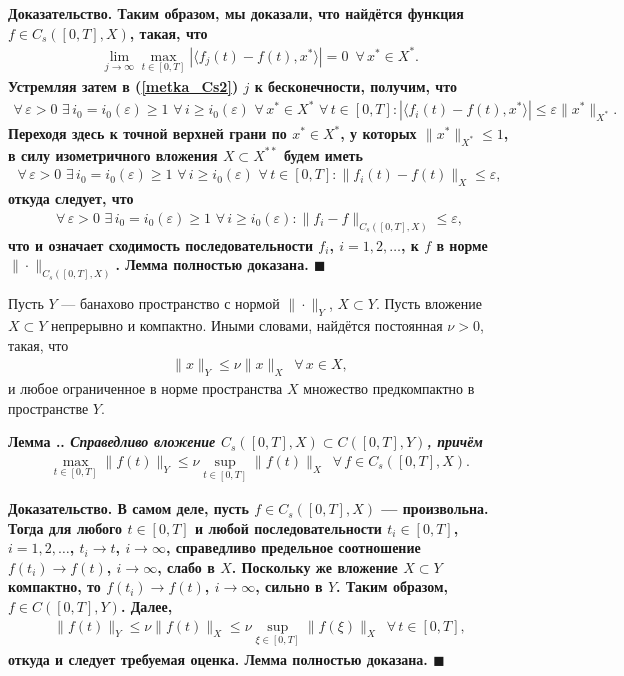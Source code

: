 \documentclass{report}
\newcounter{lem}[section]
\renewcommand{\thelem}{\thesection.\arabic{lem}}
\newenvironment{Lemma}{\par\refstepcounter{lem}\bf Лемма \thelem. \it}{\rm\par}
\newenvironment{Proof}{\par\noindent\bf Доказательство.\rm}{ $\blacksquare$\par}
\begin{document}
\begin{Proof}
Таким образом, мы доказали, что найдётся функция $f\in C_s([0,T],X)$, такая, что
\begin{gather*}
\lim\limits_{j\to\infty}\max\limits_{t\in[0,T]}|\langle f_j(t)-f(t),x^*\rangle|=0\,\,\,\forall\,x^*\in X^*.
\end{gather*}
Устремляя затем в (\ref{metka_Cs2}) $j$ к бесконечности, получим, что
\begin{gather*}
\forall\,\varepsilon>0\,\,\exists\,i_0=i_0(\varepsilon)\geqslant1\,\,\forall\,i\geqslant i_0(\varepsilon)\,\,
\forall\,x^*\in X^*\,\,\forall\,t\in[0,T]:|\langle f_i(t)-f(t),x^*\rangle|\leqslant\varepsilon\|x^*\|_{X^*}.
\end{gather*}
Переходя здесь к точной верхней грани по $x^*\in X^*$, у которых $\|x^*\|_{X^*}\leqslant1$, в силу изометричного вложения
$X\subset X^{**}$ будем иметь
\begin{gather*}
\forall\,\varepsilon>0\,\,\exists\,i_0=i_0(\varepsilon)\geqslant1\,\,\forall\,i\geqslant i_0(\varepsilon) \,\,\forall\,t\in[0,T]:\|f_i(t)-f(t)\|_X\leqslant\varepsilon,
\end{gather*}
откуда следует, что
\begin{gather*}
\forall\,\varepsilon>0\,\,\exists\,i_0=i_0(\varepsilon)\geqslant1\,\,\forall\,i\geqslant i_0(\varepsilon):\|f_i-f\|_{C_s([0,T],X)}\leqslant\varepsilon,
\end{gather*}
что и означает сходимость последовательности $f_i$, $i=1,2,\dots$, к $f$ в норме $\|\cdot\|_{C_s([0,T],X)}$. Лемма полностью доказана.
\end{Proof}

Пусть $Y$ --- банахово пространство с нормой $\|\cdot\|_Y$, $X\subset Y$. Пусть вложение $X\subset Y$ непрерывно и компактно. Иными словами, найдётся постоянная $\nu>0$, такая, что
\begin{gather*}
\|x\|_Y\leqslant\nu\|x\|_X\,\,\,\forall\,x\in X,
\end{gather*}
и любое ограниченное в норме пространства $X$ множество предкомпактно в пространстве $Y$.
\begin{Lemma}\label{Cs([0,T],X).is.subsetC([0,T],Y)} Справедливо вложение $C_s([0,T],X)\subset C([0,T],Y)$, причём
\begin{gather*}
\max\limits_{t\in[0,T]}\|f(t)\|_Y\leqslant\nu\sup\limits_{t\in[0,T]}\|f(t)\|_X\,\,\,\forall\,f\in C_s([0,T],X).
\end{gather*}
\end{Lemma}
\begin{Proof}
В самом деле, пусть $f\in C_s([0,T],X)$ --- произвольна. Тогда для любого $t\in[0,T]$ и любой последовательности $t_i\in[0,T]$, $i=1,2,\dots$, $t_i\to t$, $i\to\infty$, справедливо
предельное соотношение $f(t_i)\to f(t)$, $i\to\infty$, слабо в $X$. Поскольку же вложение $X\subset Y$ компактно, то $f(t_i)\to f(t)$, $i\to\infty$, сильно в $Y$. Таким образом,
$f\in C([0,T],Y)$. Далее,
\begin{gather*}
\|f(t)\|_Y\leqslant\nu\|f(t)\|_X\leqslant\nu\sup\limits_{\xi\in[0,T]}\|f(\xi)\|_X\,\,\,\forall\,t\in[0,T],
\end{gather*}
откуда и следует требуемая оценка. Лемма полностью доказана.
\end{Proof}
\end{document}
